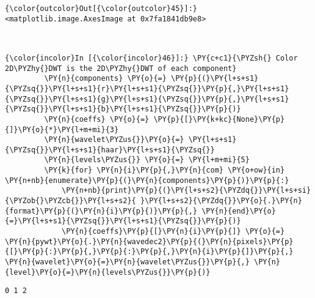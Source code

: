 \begin{Verbatim}[commandchars=\\\{\}]
{\color{outcolor}Out[{\color{outcolor}45}]:} <matplotlib.image.AxesImage at 0x7fa1841db9e8>
\end{Verbatim}
            
    \begin{center}
    \end{center}
    { \hspace*{\fill} \\}
    
    \begin{Verbatim}[commandchars=\\\{\}]
{\color{incolor}In [{\color{incolor}46}]:} \PY{c+c1}{\PYZsh{} Color 2D\PYZhy{}DWT is the 2D\PYZhy{}DWT of each component}
         \PY{n}{components} \PY{o}{=} \PY{p}{(}\PY{l+s+s1}{\PYZsq{}}\PY{l+s+s1}{r}\PY{l+s+s1}{\PYZsq{}}\PY{p}{,}\PY{l+s+s1}{\PYZsq{}}\PY{l+s+s1}{g}\PY{l+s+s1}{\PYZsq{}}\PY{p}{,}\PY{l+s+s1}{\PYZsq{}}\PY{l+s+s1}{b}\PY{l+s+s1}{\PYZsq{}}\PY{p}{)}
         \PY{n}{coeffs} \PY{o}{=} \PY{p}{[}\PY{k+kc}{None}\PY{p}{]}\PY{o}{*}\PY{l+m+mi}{3}
         \PY{n}{wavelet\PYZus{}}\PY{o}{=} \PY{l+s+s1}{\PYZsq{}}\PY{l+s+s1}{haar}\PY{l+s+s1}{\PYZsq{}}
         \PY{n}{levels\PYZus{}} \PY{o}{=} \PY{l+m+mi}{5}
         \PY{k}{for} \PY{n}{i}\PY{p}{,}\PY{n}{com} \PY{o+ow}{in} \PY{n+nb}{enumerate}\PY{p}{(}\PY{n}{components}\PY{p}{)}\PY{p}{:}
             \PY{n+nb}{print}\PY{p}{(}\PY{l+s+s2}{\PYZdq{}}\PY{l+s+si}{\PYZob{}\PYZcb{}}\PY{l+s+s2}{ }\PY{l+s+s2}{\PYZdq{}}\PY{o}{.}\PY{n}{format}\PY{p}{(}\PY{n}{i}\PY{p}{)}\PY{p}{,} \PY{n}{end}\PY{o}{=}\PY{l+s+s1}{\PYZsq{}}\PY{l+s+s1}{\PYZsq{}}\PY{p}{)}
             \PY{n}{coeffs}\PY{p}{[}\PY{n}{i}\PY{p}{]} \PY{o}{=} \PY{n}{pywt}\PY{o}{.}\PY{n}{wavedec2}\PY{p}{(}\PY{n}{pixels}\PY{p}{[}\PY{p}{:}\PY{p}{,}\PY{p}{:}\PY{p}{,}\PY{n}{i}\PY{p}{]}\PY{p}{,} \PY{n}{wavelet}\PY{o}{=}\PY{n}{wavelet\PYZus{}}\PY{p}{,} \PY{n}{level}\PY{o}{=}\PY{n}{levels\PYZus{}}\PY{p}{)}
\end{Verbatim}


    \begin{Verbatim}[commandchars=\\\{\}]
0 1 2 
    \end{Verbatim}

